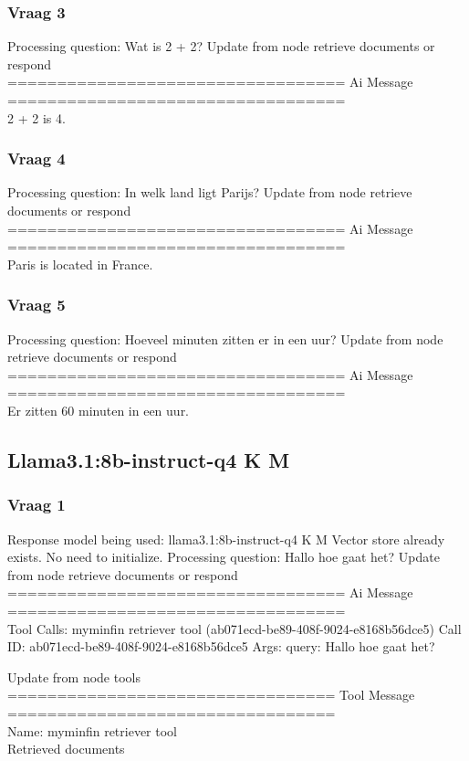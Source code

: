 \subsubsection{Vraag 3}
Processing question: Wat is 2 + 2?
Update from node retrieve  documents  or  respond
\\[1em]
================================== Ai Message ==================================
\\[1em]
2 + 2 is 4.
\subsubsection{Vraag 4}
Processing question: In welk land ligt Parijs?
Update from node retrieve  documents  or  respond
\\[1em]
================================== Ai Message ==================================
\\[1em]
Paris is located in France.
\subsubsection{Vraag 5}
Processing question: Hoeveel minuten zitten er in een uur?
Update from node retrieve  documents  or  respond
\\[1em]
================================== Ai Message ==================================
\\[1em]
Er zitten 60 minuten in een uur.


\subsection{Llama3.1:8b-instruct-q4 K M}
\subsubsection{Vraag 1}
Response model being used: llama3.1:8b-instruct-q4 K M
Vector store already exists. No need to initialize.
Processing question: Hallo hoe gaat het?
Update from node retrieve documents or respond
\\[1em]
================================== Ai Message ==================================
\\[1em]
Tool Calls:
myminfin retriever tool (ab071ecd-be89-408f-9024-e8168b56dce5)
Call ID: ab071ecd-be89-408f-9024-e8168b56dce5
Args:
query: Hallo hoe gaat het?



Update from node tools
\\[1em]
================================= Tool Message =================================
\\[1em]
Name: myminfin retriever tool
\\[1em]
Retrieved documents
\\[1em]

